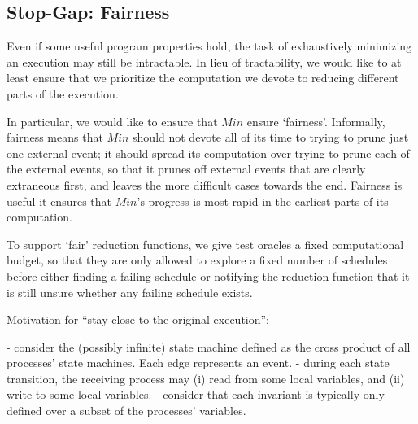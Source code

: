  

\subsection{Stop-Gap: Fairness}

Even if some useful program properties hold, the task of exhaustively
minimizing an execution may still be intractable. In lieu of tractability, we
would like to at least ensure that we prioritize the computation we devote to
reducing different parts of the execution.

In particular, we would like to ensure that $Min$ ensure `fairness'. Informally,
fairness means that
$Min$ should not devote all of its time to trying to prune just one
external event; it should spread its computation over trying to prune each
of the external events, so that it prunes off external events that are clearly
extraneous first, and leaves the more difficult cases towards the end.
Fairness is useful it ensures that $Min$'s progress is most rapid in the
earliest parts of its computation.

To support `fair' reduction functions, we give test oracles a fixed
computational budget, so that they are only allowed to explore a fixed
number of schedules before either finding a failing schedule or notifying the
reduction function that it is still unsure whether any failing schedule
exists.



Motivation for “stay close to the original execution”:

 - consider the (possibly infinite) state machine defined as the cross product of all processes' state machines. Each edge represents an event.
- during each state transition, the receiving process may (i) read from some local variables, and (ii) write to some local variables.
 - consider that each invariant is typically only defined over a subset of the processes' variables.



